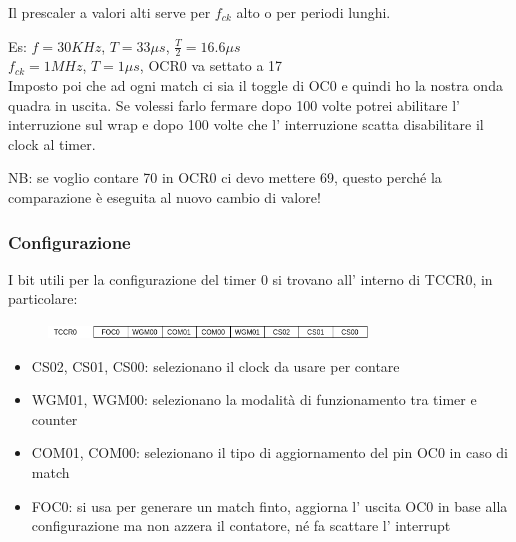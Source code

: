 Il prescaler a valori alti serve per $f_{ck}$ alto o per periodi lunghi.

Es: $f = 30KHz$, $T = 33\mu s$, $\frac{T}{2} = 16.6\mu s$ \\
$f_{ck} = 1MHz$, $T = 1\mu s$, OCR0 va settato a 17 \\

Imposto poi che ad ogni match ci sia il toggle di OC0 e quindi ho la nostra onda quadra in uscita.
Se volessi farlo fermare dopo 100 volte potrei abilitare l' interruzione sul wrap e dopo 100 volte che l' interruzione scatta disabilitare il clock al timer.

NB: se voglio contare 70 in OCR0 ci devo mettere 69, questo perché la comparazione è eseguita al nuovo cambio di valore!

\subsubsection{Configurazione}
I bit utili per la configurazione del timer 0 si trovano all' interno di TCCR0, in particolare:
\begin{figure}[H]
    \centering
    \includegraphics[width=320px]{images/18_Timer/TCCR0.png}
\end{figure}
\begin{itemize}
    \item CS02, CS01, CS00: selezionano il clock da usare per contare
    \item WGM01, WGM00: selezionano la modalità di funzionamento tra timer e counter
    \item COM01, COM00: selezionano il tipo di aggiornamento del pin OC0 in caso di match
    \item FOC0: si usa per generare un match finto, aggiorna l' uscita OC0 in base alla configurazione ma non azzera il contatore, né fa scattare l' interrupt
\end{itemize}

